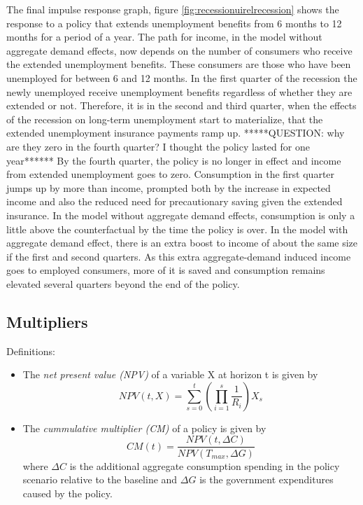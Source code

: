 \documentclass[../HAFiscal]{subfiles}
\begin{document}
The final impulse response graph, figure \ref{fig:recessionuirelrecession} shows the response to a policy that extends unemployment benefits from 6 months to 12 months for a period of a year. The path for income, in the model without aggregate demand effects, now depends on the number of consumers who receive the extended unemployment benefits. These consumers are those who have been unemployed for between 6 and 12 months. In the first quarter of the recession the newly unemployed receive unemployment benefits regardless of whether they are extended or not. Therefore, it is in the second and third quarter, when the effects of the recession on long-term unemployment start to materialize, that the extended unemployment insurance payments ramp up. *****QUESTION: why are they zero in the fourth quarter? I thought the policy lasted for one year****** By the fourth quarter, the policy is no longer in effect and income from extended unemployment goes to zero. Consumption in the first quarter jumps up by more than income, prompted both by the increase in expected income and also the reduced need for precautionary saving given the extended insurance. In the model without aggregate demand effects, consumption is only a little above the counterfactual by the time the policy is over. In the model with aggregate demand effect, there is an extra boost to income of about the same size if the first and second quarters. As this extra aggregate-demand induced income goes to employed consumers, more of it is saved and consumption remains elevated several quarters beyond the end of the policy.



\FloatBarrier
\subsection{Multipliers}

Definitions:
\begin{itemize}
	\item The \textit{net present value (NPV)} of a variable X at horizon t is given by
	\begin{equation}
	NPV(t,X) = \sum_{s=0}^{t} \left( \prod_{i=1}^{s} \frac{1}{R_i} \right) X_s
	\end{equation}
	\item The \textit{cummulative multiplier (CM)} of a policy is given by
	\begin{equation}
	CM(t) = \frac{NPV(t,\Delta C)}{NPV (T_{max},\Delta G)}
	\end{equation}
	where $\Delta C$ is the additional aggregate consumption spending in the policy scenario relative to the baseline and $\Delta G$ is the government expenditures caused by the policy.
\end{itemize}
\end{document}

